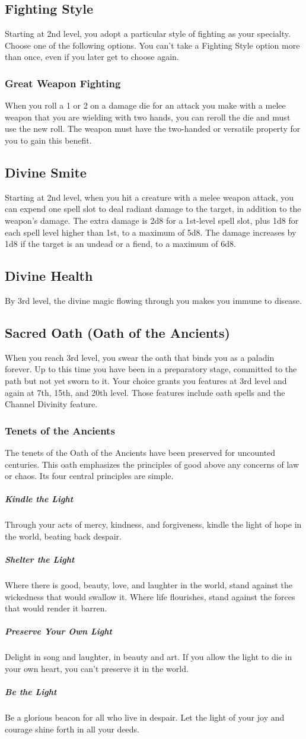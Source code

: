 \documentclass[letterpaper,openany,oneside,twocolumn]{book}
\begin{document}
\subsection*{Fighting Style}
Starting at 2nd level, you adopt a particular style of fighting as your specialty. Choose one of the following options. You can't take a Fighting Style option more than once, even if you later get to choose again.
\subsubsection*{Great Weapon Fighting}
When you roll a 1 or 2 on a damage die for an attack you make with a melee weapon that you are wielding with two hands, you can reroll the die and must use the new roll. The weapon must have the two-handed or versatile property for you to gain this benefit.
\subsection*{Divine Smite}
Starting at 2nd level, when you hit a creature with a melee weapon attack, you can expend one spell slot to deal radiant damage to the target, in addition to the weapon's damage. The extra damage is 2d8 for a 1st-level spell slot, plus 1d8 for each spell level higher than 1st, to a maximum of 5d8. The damage increases by 1d8 if the target is an undead or a fiend, to a maximum of 6d8.
\subsection*{Divine Health}
By 3rd level, the divine magic flowing through you makes you immune to disease.
\subsection*{Sacred Oath (Oath of the Ancients)}
When you reach 3rd level, you swear the oath that binds you as a paladin forever. Up to this time you have been in a preparatory stage, committed to the path but not yet sworn to it. Your choice grants you features at 3rd level and again at 7th, 15th, and 20th level. Those features include oath spells and the Channel Divinity feature.
\subsubsection*{Tenets of the Ancients}
The tenets of the Oath of the Ancients have been preserved for uncounted centuries. This oath emphasizes the principles of good above any concerns of law or chaos. Its four central principles are simple.
\subparagraph*{Kindle the Light}
Through your acts of mercy, kindness, and forgiveness, kindle the light of hope in the world, beating back despair.
\subparagraph*{Shelter the Light}
Where there is good, beauty, love, and laughter in the world, stand against the wickedness that would swallow it. Where life flourishes, stand against the forces that would render it barren.
\subparagraph*{Preserve Your Own Light}
Delight in song and laughter, in beauty and art. If you allow the light to die in your own heart, you can't preserve it in the world.
\subparagraph*{Be the Light}
Be a glorious beacon for all who live in despair. Let the light of your joy and courage shine forth in all your deeds.
\end{document}
